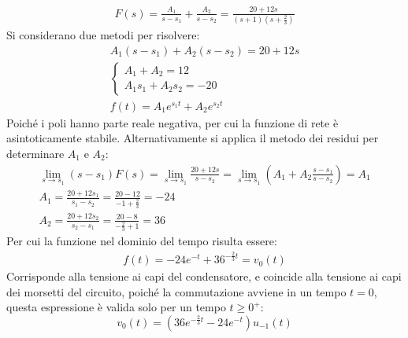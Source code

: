 \documentclass{article}
\begin{document}
\begin{gather*}
    F(s)=\displaystyle\frac{A_1}{s-s_1}+\frac{A_2}{s-s_2}=\frac{20+12s}{(s+1)\left(s+\displaystyle\frac{2}{3}\right)}
\end{gather*}
Si considerano due metodi per risolvere:
\begin{gather*}
    A_1(s-s_1)+A_2(s-s_2)=20+12s\\
    \begin{cases}
        A_1+A_2=12\\
        A_1s_1+A_2s_2=-20
    \end{cases}\\
    f(t)=A_1e^{s_1t}+A_2e^{s_2t}
\end{gather*}
Poiché i poli hanno parte reale negativa, per cui la funzione di rete è asintoticamente stabile. 
Alternativamente si applica il metodo dei residui per determinare $A_1$ e $A_2$:
\begin{gather*}
    \lim_{s\to s_1}(s-s_1)F(s)=\lim_{s\to s_1}\displaystyle\frac{20+12s}{s-s_2}=\lim_{s\to s_1}\left(A_1+A_2\frac{s-s_1}{s-s_2}\right)=A_1\\
    A_1=\displaystyle\frac{20+12s_1}{s_1-s_2}=\frac{20-12}{-1+\displaystyle\frac{2}{3}}=-24\\
    A_2=\displaystyle\frac{20+12s_2}{s_2-s_1}=\frac{20-8}{-\displaystyle\frac{2}{3}+1}=36
\end{gather*}
Per cui la funzione nel dominio del tempo risulta essere:
\begin{gather*}
    f(t)=-24e^{-t}+36^{-\frac{2}{3}t}=v_0(t)
\end{gather*}
Corrisponde alla tensione ai capi del condensatore, e coincide alla tensione ai capi dei morsetti del circuito, poiché la commutazione avviene in un tempo $t=0$, questa 
espressione è valida solo per un tempo $t\geq0^+$:
\begin{equation}
    v_0(t)=(36e^{-\frac{2}{3}t}-24e^{-t})u_{-1}(t)
\end{equation}
\end{document}
